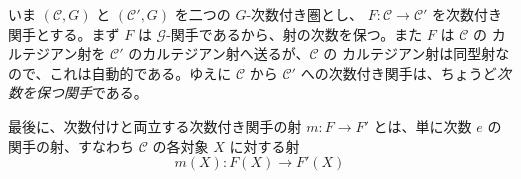 いま $(\mathcal C,G)$ と $(\mathcal C',G)$ を二つの $G$-次数付き圏とし、
$F\colon\mathcal C\to\mathcal C'$ を次数付き関手とする。まず $F$ は
$\mathcal G$-関手であるから、射の次数を保つ。また $F$ は $\mathcal C$ の
カルテジアン射を $\mathcal C'$ のカルテジアン射へ送るが、$\mathcal C$ の
カルテジアン射は同型射なので、これは自動的である。ゆえに $\mathcal C$ から
$\mathcal C'$ への次数付き関手は、ちょうど\emph{次数を保つ関手}である。

最後に、次数付けと両立する次数付き関手の射 $m\colon F\to F'$ とは、単に次数
$e$ の関手の射、すなわち $\mathcal C$ の各対象 $X$ に対する射
\[
  m(X)\colon F(X)\longrightarrow F'(X)
\]
